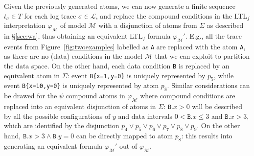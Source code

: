 
Given the previously generated atoms, we can now generate a finite sequence $t_\sigma\in T$ for each log trace $\sigma\in\mathcal{L}$, and replace the compound conditions in the LTL$_f$ interpretation $\varphi_{\mathcal{M}}$ of model $\mathcal{M}$ with a disjunction of atoms from $\Sigma$ as described in \S\ref{sec:wa}, thus obtaining an equivalent LTL$_f$ formula $\varphi_{\mathcal{M}}'$.
%
E.g., all the trace events from Figure~\ref{fig:twoexamples} labelled as \texttt{A} are replaced with the atom \texttt{A}, as there are no (data) conditions in the model $\mathcal{M}$ that we can exploit to partition the data space. On the other hand, each data condition \texttt{B} is replaced by an equivalent atom in $\Sigma$: event \texttt{B\{x=1,y=0\}} is uniquely represented by $p_5$, while event \texttt{B\{x=10,y=0\}} is uniquely represented by atom $p_8$. Similar considerations can be drawed for the $\psi$ compound atoms in $\varphi_{\mathcal{M}}$ where compound conditions are replaced into an equivalent disjunction of atoms in $\Sigma$: $\texttt{B}.x>0$ will be described by all the possible configurations of $y$ and data intervals $0<\texttt{B}.x\leq 3$ and $\texttt{B}.x>3$, which are identified by the disjunction $p_4\vee p_5\vee p_6\vee p_7\vee p_8\vee p_9$. On the other hand, $\texttt{B}.x>3\wedge \texttt{B}.y=0$ can be directly mapped to atom $p_8$: this results into generating an equivalent formula $\varphi_{\mathcal{M}}'$ out of $\varphi_{\mathcal{M}}$.

